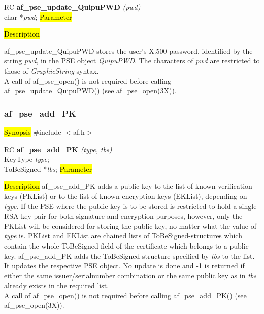 RC {\bf af\_pse\_update\_QuipuPWD} {\em (pwd)} \\
char *{\em pwd};
\hl{Parameter}

\hl{Description}

af\_pse\_update\_QuipuPWD stores the user's X.500 password, identified by the string {\em pwd}, in the PSE object {\em QuipuPWD}. The characters of {\em pwd} are restricted to those of {\em GraphicString} syntax.  
\\ [1em]
A call of af\_pse\_open() is not required before calling af\_pse\_update\_QuipuPWD()
(see af\_pse\_open(3X)).


\subsubsection{af\_pse\_add\_PK}
\label{af_add_PK}
\hl{Synopsis}
\#include $<$af.h$>$

RC {\bf af\_pse\_add\_PK} {\em (type, tbs)} \\
KeyType {\em type}; \\
ToBeSigned *{\em tbs};
\hl{Parameter}


\hl{Description}
af\_pse\_add\_PK adds a public key to the list of known 
verification keys (PKList) or to the list of known encryption keys (EKList), depending
on {\em type}.
If the PSE where the public key is to be stored is restricted to hold a single RSA key pair
for both signature and encryption purposes, however, only the PKList will be considered for storing the public key,
no matter what the value of {\em type} is.
PKList and EKList are chained lists of ToBeSigned-structures which contain the
whole ToBeSigned field of the certificate which belongs to a public key.
af\_pse\_add\_PK adds the ToBeSigned-structure specified by {\em tbs} to the list.
It updates the respective PSE object. No update is done and -1 is returned if
either the same issuer/serialnumber combination or the same public key as in {\em tbs}
already exists in the required list.
\\ [1em]
A call of af\_pse\_open() is not required before calling af\_pse\_add\_PK()
(see af\_pse\_open(3X)).


